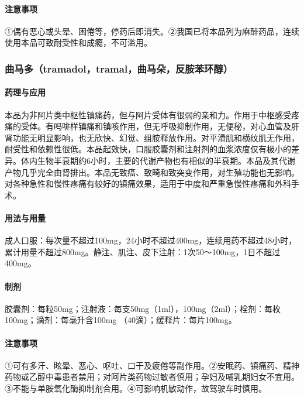 \paragraph{注意事项}

①偶有恶心或头晕、困倦等，停药后即消失。②我国已将本品列为麻醉药品，连续使用本品可致耐受性和成瘾，不可滥用。

\subsubsection{曲马多（tramadol，tramal，曲马朵，反胺苯环醇）}

\paragraph{药理与应用}

本品为非阿片类中枢性镇痛药，但与阿片受体有很弱的亲和力。作用于中枢感受疼痛的受体。有吗啡样镇痛和镇咳作用，但无呼吸抑制作用，无便秘，对心血管及肝肾功能无明显影响，也无欣快、幻觉、组胺释放作用。对平滑肌和横纹肌无作用，耐受性和依赖性很低。本品起效快，口服胶囊剂和注射剂的血浆浓度仅有极小的差异。体内生物半衰期约6小时，主要的代谢产物也有相似的半衰期。本品及其代谢产物几乎完全由肾排出。本品无致癌、致畸和致突变作用，对生殖功能也无影响。对各种急性和慢性疼痛有较好的镇痛效果，适用于中度和严重急慢性疼痛和外科手术。

\paragraph{用法与用量}

成人口服：每次量不超过100mg，24小时不超过400mg，连续用药不超过48小时，累计用量不超过800mg。静注、肌注、皮下注射：1次50～100mg，1日不超过400mg。

\paragraph{制剂}

胶囊剂：每粒50mg；注射液：每支50mg（1ml），100mg（2ml）；栓剂：每枚100mg；滴剂：每毫升含100mg
（40滴）；缓释片：每片100mg。

\paragraph{注意事项}

①可有多汗、眩晕、恶心、呕吐、口干及疲倦等副作用。②安眠药、镇痛药、精神药物或乙醇中毒患者禁用；对阿片类药物过敏者慎用；孕妇及哺乳期妇女不宜用。③不能与单胺氧化酶抑制剂合用。④可影响机敏动作，故驾驶车时慎用。

